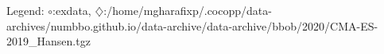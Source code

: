 Legend: {\color{NavyBlue}$\circ$}:exdata, {\color{Magenta}$\diamondsuit$}:/home/mgharafixp/.cocopp/data-archives/numbbo.github.io/data-archive/data-archive/bbob/2020/CMA-ES-2019\_Hansen.tgz